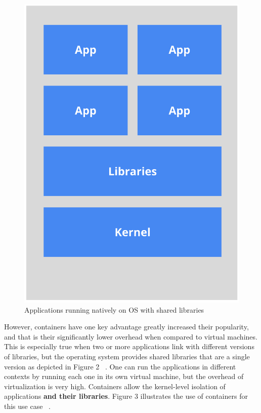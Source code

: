 \documentclass[10pt,twocolumn]{article}
\begin{document}
\begin{figure}[thpb]
  \centering
      \includegraphics[width=\columnwidth]{native_app_libs}
    \caption{Applications running natively on OS with shared libraries ~\cite{container_shared_lib}}
    \label{fig:native_app_libs}
\end{figure}

However, containers have one key advantage greatly increased their popularity, and that is their significantly lower overhead when compared to virtual machines.
This is especially true when two or more applications link with different versions of libraries, but the operating system provides shared libraries that are a single version as depicted in Figure 2 ~\cite{container_shared_lib}.
One can run the applications in different contexts by running each one in its own virtual machine, but the overhead of virtualization is very high.
Containers allow the kernel-level isolation of applications \textbf{and their libraries}.
Figure 3 illustrates the use of containers for this use case ~\cite{container_shared_lib}.
\end{document}
